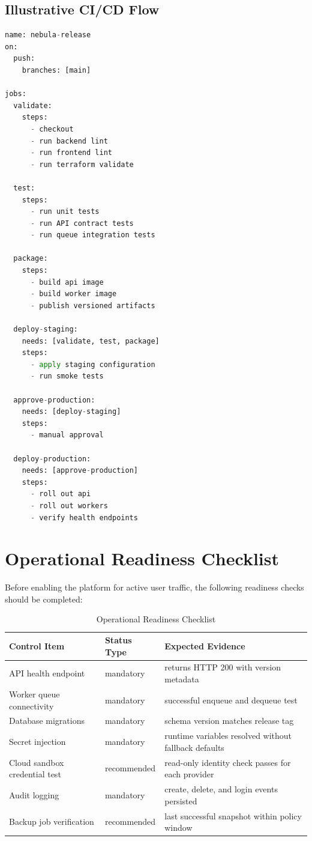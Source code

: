 \subsection{Illustrative CI/CD Flow}
\begin{lstlisting}[language=Python, caption=Release Pipeline Stages in Pseudo Workflow Form]
name: nebula-release
on:
  push:
    branches: [main]

jobs:
  validate:
    steps:
      - checkout
      - run backend lint
      - run frontend lint
      - run terraform validate

  test:
    steps:
      - run unit tests
      - run API contract tests
      - run queue integration tests

  package:
    steps:
      - build api image
      - build worker image
      - publish versioned artifacts

  deploy-staging:
    needs: [validate, test, package]
    steps:
      - apply staging configuration
      - run smoke tests

  approve-production:
    needs: [deploy-staging]
    steps:
      - manual approval

  deploy-production:
    needs: [approve-production]
    steps:
      - roll out api
      - roll out workers
      - verify health endpoints
\end{lstlisting}

\section{Operational Readiness Checklist}
Before enabling the platform for active user traffic, the following readiness checks should be completed:

\begin{table}[h]
\centering
\caption{Operational Readiness Checklist}
\label{tab:ops_readiness}
\begin{tabular}{|p{4.2cm}|p{2.2cm}|p{5.0cm}|}
\hline
\textbf{Control Item} & \textbf{Status Type} & \textbf{Expected Evidence} \\ \hline
API health endpoint & mandatory & returns HTTP 200 with version metadata \\ \hline
Worker queue connectivity & mandatory & successful enqueue and dequeue test \\ \hline
Database migrations & mandatory & schema version matches release tag \\ \hline
Secret injection & mandatory & runtime variables resolved without fallback defaults \\ \hline
Cloud sandbox credential test & recommended & read-only identity check passes for each provider \\ \hline
Audit logging & mandatory & create, delete, and login events persisted \\ \hline
Backup job verification & recommended & last successful snapshot within policy window \\ \hline
\end{tabular}
\end{table}

